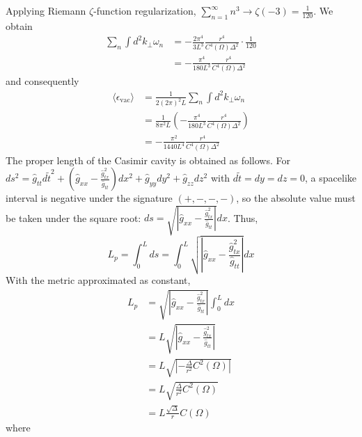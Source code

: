 \documentclass[english]{article}
\begin{document}
 Applying Riemann $\zeta$-function regularization, $\sum^{\infty}_{n=1}n^{3}\rightarrow\zeta\left(-3\right)=\frac{1}{120}$.
We obtain 
\begin{align*}
\sum_{n}\int d^{2}k_{\perp}\omega_{n} & =-\frac{2\pi^{4}}{3L^{3}}\frac{r^{4}}{C^{4}\left(\Omega\right)\Delta^{2}}\cdot\frac{1}{120}\\
 & =-\frac{\pi^{4}}{180L^{3}}\frac{r^{4}}{C^{4}\left(\Omega\right)\Delta^{2}}
\end{align*}
 and consequently 
\begin{align*}
\langle\epsilon_{\text{vac}}\rangle & =\frac{1}{2\left(2\pi\right)^{2}L}\sum_{n}\int d^{2}k_{\perp}\omega_{n}\\
 & =\frac{1}{8\pi^{2}L}\left(-\frac{\pi^{4}}{180L^{3}}\frac{r^{4}}{C^{4}\left(\Omega\right)\Delta^{2}}\right)\\
 & =-\frac{\pi^{2}}{1440L^{4}}\frac{r^{4}}{C^{4}\left(\Omega\right)\Delta^{2}}
\end{align*}
 The proper length of the Casimir cavity is obtained as follows. For
$ds^{2}=\hat{g}_{tt}d\tilde{t}^{2}+\left(\hat{g}_{xx}-\frac{\hat{g}^{2}_{tx}}{\hat{g}_{tt}}\right)dx^{2}+\hat{g}_{yy}dy^{2}+\hat{g}_{zz}dz^{2}$
with $d\tilde{t}=dy=dz=0$, a spacelike interval is negative under
the signature $(+,-,-,-)$, so the absolute value must be taken under
the square root: $ds=\sqrt{\left|\hat{g}_{xx}-\frac{\hat{g}^{2}_{tx}}{\hat{g}_{tt}}\right|}dx$.
Thus, 
\[
L_{p}=\int^{L}_{0}ds=\int^{L}_{0}\sqrt{\left|\hat{g}_{xx}-\frac{\hat{g}^{2}_{tx}}{\hat{g}_{tt}}\right|}dx
\]
 With the metric approximated as constant, 
\begin{align*}
L_{p} & =\sqrt{\left|\hat{g}_{xx}-\frac{\hat{g}^{2}_{tx}}{\hat{g}_{tt}}\right|}\int^{L}_{0}dx\\
 & =L\sqrt{\left|\hat{g}_{xx}-\frac{\hat{g}^{2}_{tx}}{\hat{g}_{tt}}\right|}\\
 & =L\sqrt{\left|-\frac{\Delta}{r^{2}}C^{2}\left(\Omega\right)\right|}\\
 & =L\sqrt{\frac{\Delta}{r^{2}}C^{2}\left(\Omega\right)}\\
 & =L\frac{\sqrt{\Delta}}{r}C\left(\Omega\right)
\end{align*}
 where 
\end{document}

